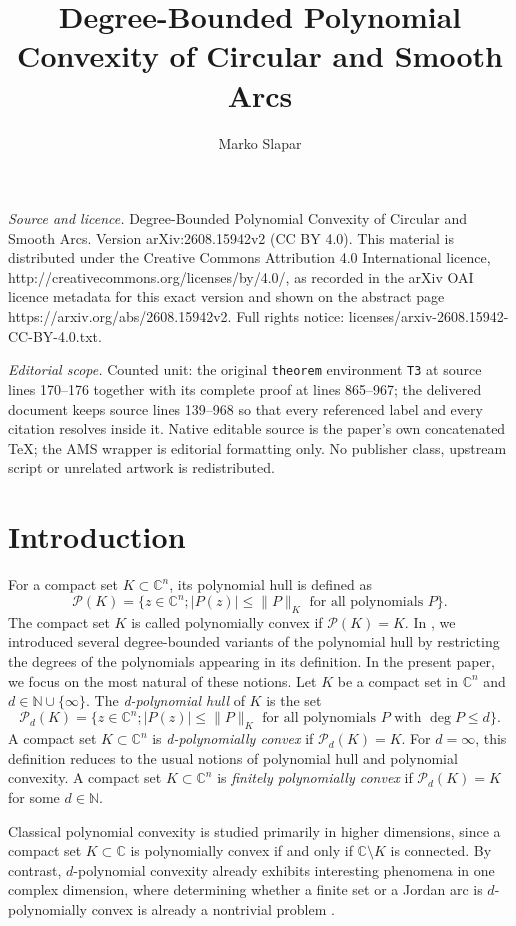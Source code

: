 \documentclass[10pt,a4paper]{amsart}
\newcommand{\C}{\mathbb{C}}
\newcommand{\N}{\mathbb{N}}
\newcommand{\cP}{\mathcal{P}}
\numberwithin{equation}{section}
\begin{document}
\title[Degree-Bounded Polynomial Convexity of Circular and Smooth A]{Degree-Bounded Polynomial Convexity of Circular and Smooth Arcs}
\author{Marko Slapar}
\date{}
\maketitle
\noindent\emph{Source and licence.} Degree-Bounded Polynomial Convexity of Circular and Smooth Arcs. Version arXiv:2608.15942v2 (CC BY 4.0). This material is distributed under the Creative Commons Attribution 4.0 International licence, http://creativecommons.org/licenses/by/4.0/, as recorded in the arXiv OAI licence metadata for this exact version and shown on the abstract page https://arxiv.org/abs/2608.15942v2. Full rights notice: licenses/arxiv-2608.15942-CC-BY-4.0.txt.\par\smallskip
\noindent\textit{Editorial scope.} Counted unit: the original \texttt{theorem} environment \texttt{T3} at source lines 170--176 together with its complete proof at lines 865--967; the delivered document keeps source lines 139--968 so that every referenced label and every citation resolves inside it. Native editable source is the paper's own concatenated TeX; the AMS wrapper is editorial formatting only. No publisher class, upstream script or unrelated artwork is redistributed.
\section{Introduction} 

\noindent For a compact set $K\subset \C^n$, its polynomial hull is defined as 
\[\cP(K)=\{z\in\C^n; |P(z)|\le \|P\|_K \text{ for all polynomials }P\}.\] 
The compact set $K$ is called polynomially convex if $\cP(K)=K$. In \cite{S}, we introduced several degree-bounded variants of the polynomial hull by restricting the degrees of the polynomials appearing in its definition. In the present paper, we focus on the most natural of these notions. Let $K$ be a compact set in $\C^n$ and $d\in\N\cup\{\infty\}$. The \textit{d-polynomial hull} of $K$ is the set \[\cP_d(K)=\{z\in\C^n; |P(z)|\le \|P\|_K \text{ for all polynomials }P \text{ with }\deg P\le d\}.\] 
A compact set $K\subset\C^n$ is \textit{d-polynomially convex} if $\cP_d(K)=K$. For $d=\infty$, this definition reduces to the usual notions of polynomial hull and polynomial convexity. A compact set $K\subset\C^n$ is  \textit{ finitely polynomially convex} if $\cP_d(K)=K$ for some $d\in\N$. 

Classical polynomial convexity is studied primarily in higher dimensions, since a compact set $K\subset\C$ is polynomially convex if and only if $\C\setminus K$ is connected. By contrast, $d$-polynomial convexity already exhibits interesting phenomena in one complex dimension, where determining whether a finite set or a Jordan arc is $d$-polynomially convex is already a nontrivial problem \cite{S}. 
\end{document}

